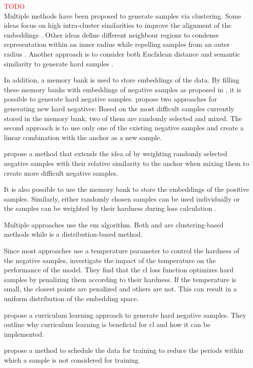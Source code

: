 \textcolor{red}{TODO\\}
Multiple methods have been proposed to generate samples via clustering.
Some ideas focus on high intra-cluster similarities to improve the alignment of the embeddings \citet{DRC_2020}.
Other ideas define different neighbour regions to condense representation within an inner radius 
while repelling samples from an outer radius \citet{local_aggr_2019}.
Another approach is to consider both Euclidean distance and semantic similarity to generate hard samples \citet{mining_manifolds_2018}.
\citet{PCL_2021}


In addition, a memory bank is used to store embeddings of the data.
By filling these memory banks with embeddings of negative samples as proposed in \citet{mochi_2020}, 
it is possible to generate hard negative samples.
\citeauthor{mochi_2020} propose two approaches for generating new hard negatives: 
Based on the most difficult samples currently stored in the memory bank, two of them are randomly selected and mixed.
The second approach is to use only one of the existing negative samples and create a linear combination with the anchor as a new sample.

\citet{progcl_2022} propose a method that extends the idea of \citet{mochi_2020} by weighting randomly selected negative samples 
with their relative similarity to the anchor when mixing them to create more difficult negative samples.

It is also possible to use the memory bank to store the embeddings of the positive samples.
Similarly, either randomly chosen samples can be used individually or 
the samples can be weighted by their hardness during loss calculation \citet{mining_potential_2024}.


Multiple approaches use the \ac{em} algorithm.
Both \citet{DRC_2020} and \citet{PCL_2021} are clustering-based methods while \citet{progcl_2022} is a distribution-based method.

Since most approaches use a temperature parameter to control the hardness of the negative samples, 
\citet{CL_temp_2021,grape_2024} investigate the impact of the temperature on the performance of the model.
They find that the \ac{cl} loss function optimizes hard samples by penalizing them according to their hardness.
If the temperature is small, the closest points are penalized and others are not.
This can result in a uniform distribution of the embedding space.

\citet{curricular_weighting_2024} propose a curriculum learning approach to generate hard negative samples.
They outline why curriculum learning is beneficial for \ac{cl} and how it can be implemented.

\citet{PIC_2020} propose a method to schedule the data for training 
to reduce the periods within which a sample is not considered for training.